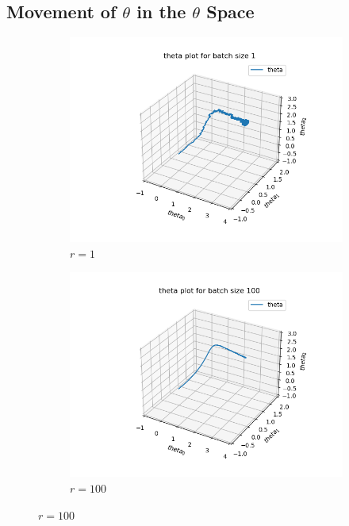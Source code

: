 \documentclass[11pt]{article}
\begin{document}
\subsection{Movement of $\theta$ in the $\theta$ Space}
\begin{figure}[H]
    \begin{subfigure}[t]{0.45\textwidth}
        \centering
        \includegraphics[width=\linewidth]{Q2/output/d1.png}
        \caption{$r=1$}
    \end{subfigure} 
    \hfill
    \begin{subfigure}[t]{0.45\textwidth}
        \centering
        \includegraphics[width=\linewidth]{Q2/output/d100.png}
        \caption{$r=100$}
    \end{subfigure} 

\end{figure}
\end{document}
